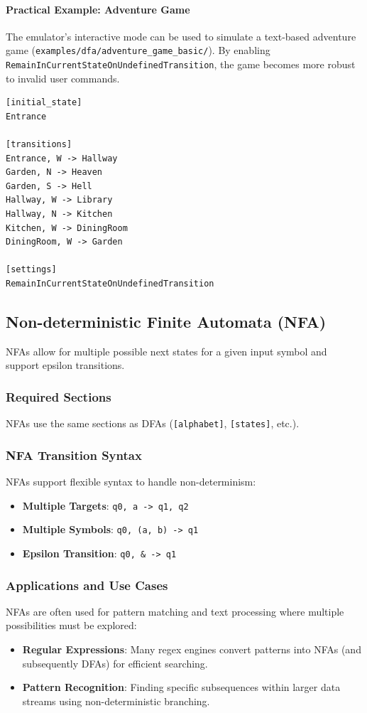 \documentclass{article}
\begin{document}
\paragraph{Practical Example: Adventure Game}
The emulator's interactive mode can be used to simulate a text-based adventure game (\texttt{examples/dfa/adventure\_game\_basic/}). By enabling \texttt{RemainInCurrentStateOnUndefinedTransition}, the game becomes more robust to invalid user commands.
\begin{lstlisting}[caption=DFA for a simple adventure game]
[initial_state]
Entrance

[transitions]
Entrance, W -> Hallway
Garden, N -> Heaven
Garden, S -> Hell
Hallway, W -> Library
Hallway, N -> Kitchen
Kitchen, W -> DiningRoom
DiningRoom, W -> Garden

[settings]
RemainInCurrentStateOnUndefinedTransition
\end{lstlisting}

\subsection{Non-deterministic Finite Automata (NFA)}
NFAs allow for multiple possible next states for a given input symbol and support epsilon transitions.

\subsubsection{Required Sections}
NFAs use the same sections as DFAs (\texttt{[alphabet]}, \texttt{[states]}, etc.).

\subsubsection{NFA Transition Syntax}
NFAs support flexible syntax to handle non-determinism:
\begin{itemize}
    \item \textbf{Multiple Targets}: \texttt{q0, a -> q1, q2}
    \item \textbf{Multiple Symbols}: \texttt{q0, (a, b) -> q1}
    \item \textbf{Epsilon Transition}: \texttt{q0, \& -> q1}
\end{itemize}

\subsubsection{Applications and Use Cases}
NFAs are often used for pattern matching and text processing where multiple possibilities must be explored:
\begin{itemize}
    \item \textbf{Regular Expressions}: Many regex engines convert patterns into NFAs (and subsequently DFAs) for efficient searching.
    \item \textbf{Pattern Recognition}: Finding specific subsequences within larger data streams using non-deterministic branching.
\end{itemize}
\end{document}
